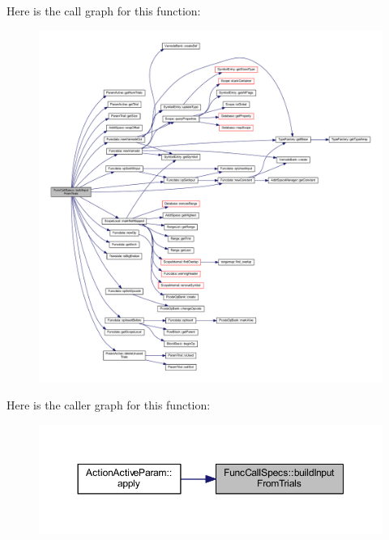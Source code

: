 Here is the call graph for this function\+:
\nopagebreak
\begin{figure}[H]
\begin{center}
\leavevmode
\includegraphics[width=350pt]{class_func_call_specs_a1bb49b65cf036e8bc8b398e549b26a9c_cgraph}
\end{center}
\end{figure}
Here is the caller graph for this function\+:
\nopagebreak
\begin{figure}[H]
\begin{center}
\leavevmode
\includegraphics[width=350pt]{class_func_call_specs_a1bb49b65cf036e8bc8b398e549b26a9c_icgraph}
\end{center}
\end{figure}
\mbox{\label{class_func_call_specs_a15f172165e29fbabfbb02be245ee1c98}} 
